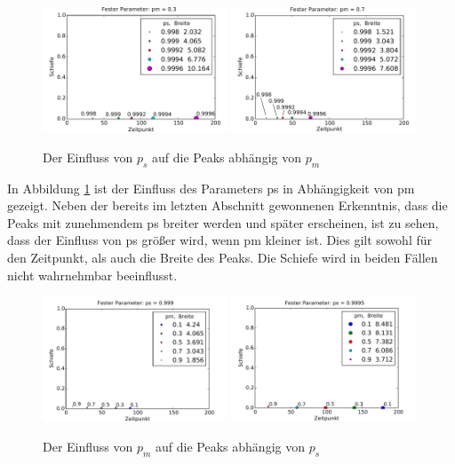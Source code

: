 \begin{figure}[h]
\includegraphics[width=0.49\textwidth]{bilder/ps/psfest_pm03}
\includegraphics[width=0.49\textwidth]{bilder/ps/psfest_pm07}
\caption{Der Einfluss von $p_{s}$ auf die Peaks abhängig von $p_{m}$}
\label{einfluss_ps_1}
\end{figure}

In Abbildung \ref{einfluss_ps_1} ist der Einfluss des Parameters ps in Abhängigkeit von pm gezeigt. Neben der bereits im letzten Abschnitt gewonnenen Erkenntnis, dass die Peaks mit zunehmendem ps breiter werden und später erscheinen, ist zu sehen, dass der Einfluss von ps größer wird, wenn pm kleiner ist. Dies gilt sowohl für den Zeitpunkt, als auch die Breite des Peaks. Die Schiefe wird in beiden Fällen nicht wahrnehmbar beeinflusst.

\begin{figure}[h]
\includegraphics[width=0.49\textwidth]{bilder/pm/pmfest_ps0999}
\includegraphics[width=0.49\textwidth]{bilder/pm/pmfest_ps09995}
\caption{Der Einfluss von $p_{m}$ auf die Peaks abhängig von $p_{s}$}
\label{einfluss_pm_1}
\end{figure}

